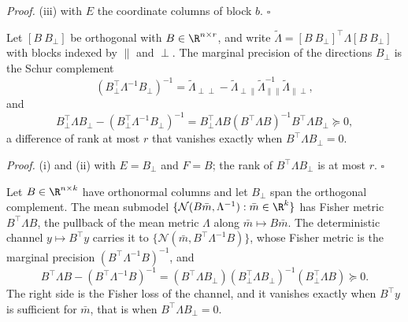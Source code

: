 \noindent\emph{Proof.}
(iii) with \(E\) the coordinate columns of block \(b\).
\(\square\)

Let \([B\ B_\perp]\) be orthogonal with \(B\in\R^{n\times r}\), and write
\(\widetilde\Lambda=[B\ B_\perp]^\top\Lambda[B\ B_\perp]\) with blocks indexed
by \(\parallel\) and \(\perp\). The marginal precision of the directions
\(B_\perp\) is the Schur complement
\begin{equation}
\left(B_\perp^\top\Lambda^{-1}B_\perp\right)^{-1}
=\widetilde\Lambda_{\perp\perp}
-\widetilde\Lambda_{\perp\parallel}\widetilde\Lambda_{\parallel\parallel}^{-1}\widetilde\Lambda_{\parallel\perp},
\label{eq:restrict-schur-in-basis}
\end{equation}
and
\begin{equation}
B_\perp^\top\Lambda B_\perp-\left(B_\perp^\top\Lambda^{-1}B_\perp\right)^{-1}
=B_\perp^\top\Lambda B\left(B^\top\Lambda B\right)^{-1}B^\top\Lambda B_\perp
\succeq0,
\label{eq:restrict-marginal-vs-restricted}
\end{equation}
a difference of rank at most \(r\) that vanishes exactly when
\(B^\top\Lambda B_\perp=0\). 

\noindent\emph{Proof.}
(i) and (ii) with \(E=B_\perp\) and \(F=B\); the rank of
\(B^\top\Lambda B_\perp\) is at most \(r\). \(\square\)

Let \(B\in\R^{n\times k}\) have orthonormal columns and let \(B_\perp\) span
the orthogonal complement. The mean submodel
\(\{\mathcal N(B\bar m,\Lambda^{-1}):\bar m\in\R^k\}\) has Fisher metric
\(B^\top\Lambda B\), the pullback of the mean metric \(\Lambda\) along
\(\bar m\mapsto B\bar m\). The deterministic channel \(y\mapsto B^\top y\)
carries it to \(\{\mathcal N(\bar m,B^\top\Lambda^{-1}B)\}\), whose Fisher
metric is the marginal precision \((B^\top\Lambda^{-1}B)^{-1}\), and
\begin{equation}
B^\top\Lambda B-\left(B^\top\Lambda^{-1}B\right)^{-1}
=\left(B^\top\Lambda B_\perp\right)\left(B_\perp^\top\Lambda B_\perp\right)^{-1}\left(B_\perp^\top\Lambda B\right)
\succeq 0.
\label{eq:ig-restriction-marginal}
\end{equation}
The right side is the Fisher loss of the channel, and it vanishes exactly when
\(B^\top y\) is sufficient for \(\bar m\), that is when
\(B^\top\Lambda B_\perp=0\). 

